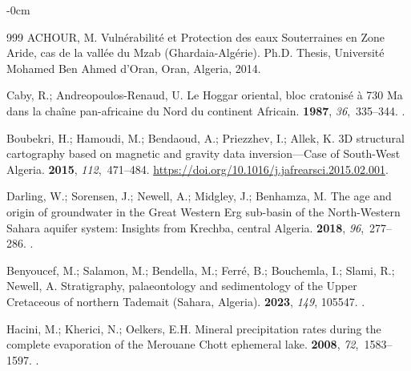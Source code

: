 \documentclass[asi,article,accept,pdftex,moreauthors]{Definitions/mdpi}
\begin{document}
\begin{adjustwidth}{-\extralength}{0cm}
\begin{thebibliography}{999}
ACHOUR, M.
\newblock Vuln{\'e}rabilit{\'e} et Protection des eaux Souterraines en Zone
  Aride, cas de la vall{\'e}e du Mzab (Ghardaia-Alg{\'e}rie).
\newblock Ph.D. Thesis, Universit{\'e} Mohamed Ben Ahmed d'Oran, Oran, Algeria, %
 2014.

Caby, R.; Andreopoulos-Renaud, U.
\newblock Le Hoggar oriental, bloc cratonisé à 730 Ma dans la chaîne
  pan-africaine du Nord du continent Africain.
 {\bf 1987}, {\em 36},~335--344.
.

Boubekri, H.; Hamoudi, M.; Bendaoud, A.; Priezzhev, I.; Allek, K.
\newblock 3D structural cartography based on magnetic and gravity data
  inversion---Case of South-West Algeria.
 {\bf 2015}, {\em
  112},~471--484. %
  {\url{https://doi.org/10.1016/j.jafrearsci.2015.02.001}}.

Darling, W.; Sorensen, J.; Newell, A.; Midgley, J.; Benhamza, M.
\newblock The age and origin of groundwater in the Great Western Erg sub-basin
  of the North-Western Sahara aquifer system: Insights from Krechba, central
  Algeria.
 {\bf 2018}, {\em 96},~277--286.
.

Benyoucef, M.; Salamon, M.; Bendella, M.; Ferré, B.; Bouchemla, I.; Slami, R.;
  Newell, A.
\newblock Stratigraphy, palaeontology and sedimentology of the Upper Cretaceous
  of northern Tademait (Sahara, Algeria).
 {\bf 2023}, \emph{149}, 105547.
\mbox{.}

Hacini, M.; Kherici, N.; Oelkers, E.H.
\newblock Mineral precipitation rates during the complete evaporation of the
  Merouane Chott ephemeral lake.
 {\bf 2008}, {\em
  72},~1583--1597.
.


\end{thebibliography}
\end{adjustwidth}
\end{document}
